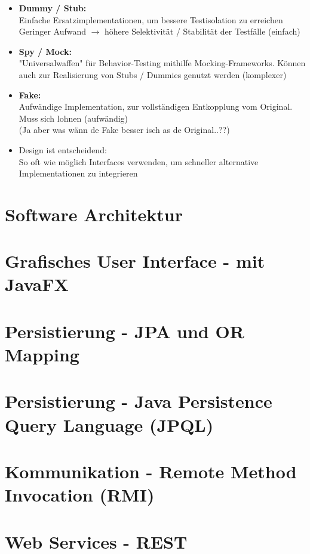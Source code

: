 \documentclass[a4paper]{article}
\begin{document}
			\begin{itemize}
				\item \textbf{Dummy / Stub:}\\
				Einfache Ersatzimplementationen, um bessere Testisolation zu erreichen\\
				Geringer Aufwand $\rightarrow$ höhere Selektivität / Stabilität der Testfälle (einfach)
				
				\item \textbf{Spy / Mock:}\\
				"Universalwaffen" für Behavior-Testing mithilfe Mocking-Frameworks.
				Können auch zur Realisierung von Stubs / Dummies genutzt werden (komplexer)
				
				\item \textbf{Fake:}\\
				Aufwändige Implementation, zur vollständigen Entkopplung vom Original.\\
				Muss sich lohnen (aufwändig)\\
				(Ja aber was wänn de Fake besser isch as de Original..??)\\
				
				\item Design ist entscheidend:\\
				So oft wie möglich Interfaces verwenden, um schneller alternative Implementationen zu integrieren
			\end{itemize}
				
	\newpage
	\section{Software Architektur}
		
		
	\newpage
	\section{Grafisches User Interface - mit JavaFX}	
		
		
	\newpage
	\section{Persistierung - JPA und OR Mapping}
	
		
	\newpage
	\section{Persistierung - Java Persistence Query Language (JPQL)}
		
		
	\newpage
	\section{Kommunikation - Remote Method Invocation (RMI)}
	
	
	\newpage
	\section{Web Services - REST}
	
		
		
\end{document}
